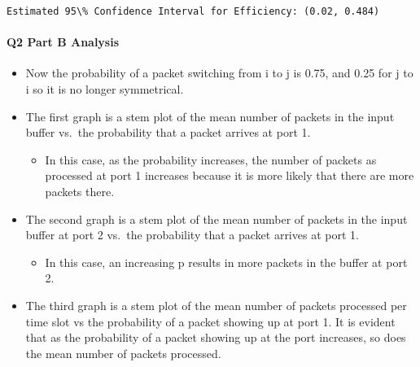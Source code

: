 \documentclass[11pt]{article}
\makeatletter
\providecommand{\tightlist}{%
      \setlength{\itemsep}{0pt}\setlength{\parskip}{0pt}}
\newcommand{\boxspacing}{\kern\kvtcb@left@rule\kern\kvtcb@boxsep}
\newcommand{\prompt}[4]{
        \ttfamily\llap{{\color{#2}[#3]:\hspace{3pt}#4}}\vspace{-\baselineskip}
    }
\makeatother
\begin{document}
    \begin{Verbatim}[commandchars=\\\{\}]
Estimated 95\% Confidence Interval for Efficiency: (0.02, 0.484)
    \end{Verbatim}

    \hypertarget{q2-part-b-analysis}{%
\paragraph{Q2 Part B Analysis}\label{q2-part-b-analysis}}

    \begin{itemize}
\tightlist
\item
  Now the probability of a packet switching from i to j is 0.75, and
  0.25 for j to i so it is no longer symmetrical.
\item
  The first graph is a stem plot of the mean number of packets in the
  input buffer vs.~the probability that a packet arrives at port 1.

  \begin{itemize}
  \tightlist
  \item
    In this case, as the probability increases, the number of packets as
    processed at port 1 increases because it is more likely that there
    are more packets there.
  \end{itemize}
\item
  The second graph is a stem plot of the mean number of packets in the
  input buffer at port 2 vs.~the probability that a packet arrives at
  port 1.

  \begin{itemize}
  \tightlist
  \item
    In this case, an increasing p results in more packets in the buffer
    at port 2.
  \end{itemize}
\item
  The third graph is a stem plot of the mean number of packets processed
  per time slot vs the probability of a packet showing up at port 1. It
  is evident that as the probability of a packet showing up at the port
  increases, so does the mean number of packets processed.
\end{itemize}

    \begin{tcolorbox}[breakable, size=fbox, boxrule=1pt, pad at break*=1mm,colback=cellbackground, colframe=cellborder]
\prompt{In}{incolor}{ }{\boxspacing}
\begin{Verbatim}[commandchars=\\\{\}]

\end{Verbatim}
\end{tcolorbox}


    
    
    
\end{document}

